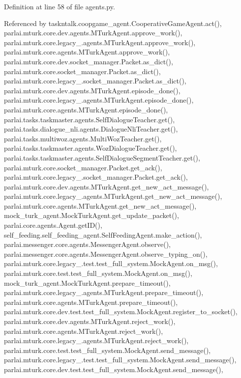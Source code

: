 Definition at line 58 of file agents.\+py.



Referenced by taskntalk.\+coopgame\+\_\+agent.\+Cooperative\+Game\+Agent.\+act(), parlai.\+mturk.\+core.\+dev.\+agents.\+M\+Turk\+Agent.\+approve\+\_\+work(), parlai.\+mturk.\+core.\+legacy\+\_.\+agents.\+M\+Turk\+Agent.\+approve\+\_\+work(), parlai.\+mturk.\+core.\+agents.\+M\+Turk\+Agent.\+approve\+\_\+work(), parlai.\+mturk.\+core.\+dev.\+socket\+\_\+manager.\+Packet.\+as\+\_\+dict(), parlai.\+mturk.\+core.\+socket\+\_\+manager.\+Packet.\+as\+\_\+dict(), parlai.\+mturk.\+core.\+legacy\+\_.\+socket\+\_\+manager.\+Packet.\+as\+\_\+dict(), parlai.\+mturk.\+core.\+dev.\+agents.\+M\+Turk\+Agent.\+episode\+\_\+done(), parlai.\+mturk.\+core.\+legacy\+\_.\+agents.\+M\+Turk\+Agent.\+episode\+\_\+done(), parlai.\+mturk.\+core.\+agents.\+M\+Turk\+Agent.\+episode\+\_\+done(), parlai.\+tasks.\+taskmaster.\+agents.\+Self\+Dialogue\+Teacher.\+get(), parlai.\+tasks.\+dialogue\+\_\+nli.\+agents.\+Dialogue\+Nli\+Teacher.\+get(), parlai.\+tasks.\+multiwoz.\+agents.\+Multi\+Woz\+Teacher.\+get(), parlai.\+tasks.\+taskmaster.\+agents.\+Woz\+Dialogue\+Teacher.\+get(), parlai.\+tasks.\+taskmaster.\+agents.\+Self\+Dialogue\+Segment\+Teacher.\+get(), parlai.\+mturk.\+core.\+socket\+\_\+manager.\+Packet.\+get\+\_\+ack(), parlai.\+mturk.\+core.\+legacy\+\_.\+socket\+\_\+manager.\+Packet.\+get\+\_\+ack(), parlai.\+mturk.\+core.\+dev.\+agents.\+M\+Turk\+Agent.\+get\+\_\+new\+\_\+act\+\_\+message(), parlai.\+mturk.\+core.\+legacy\+\_.\+agents.\+M\+Turk\+Agent.\+get\+\_\+new\+\_\+act\+\_\+message(), parlai.\+mturk.\+core.\+agents.\+M\+Turk\+Agent.\+get\+\_\+new\+\_\+act\+\_\+message(), mock\+\_\+turk\+\_\+agent.\+Mock\+Turk\+Agent.\+get\+\_\+update\+\_\+packet(), parlai.\+core.\+agents.\+Agent.\+get\+I\+D(), self\+\_\+feeding.\+self\+\_\+feeding\+\_\+agent.\+Self\+Feeding\+Agent.\+make\+\_\+action(), parlai.\+messenger.\+core.\+agents.\+Messenger\+Agent.\+observe(), parlai.\+messenger.\+core.\+agents.\+Messenger\+Agent.\+observe\+\_\+typing\+\_\+on(), parlai.\+mturk.\+core.\+legacy\+\_.\+test.\+test\+\_\+full\+\_\+system.\+Mock\+Agent.\+on\+\_\+msg(), parlai.\+mturk.\+core.\+test.\+test\+\_\+full\+\_\+system.\+Mock\+Agent.\+on\+\_\+msg(), mock\+\_\+turk\+\_\+agent.\+Mock\+Turk\+Agent.\+prepare\+\_\+timeout(), parlai.\+mturk.\+core.\+legacy\+\_.\+agents.\+M\+Turk\+Agent.\+prepare\+\_\+timeout(), parlai.\+mturk.\+core.\+agents.\+M\+Turk\+Agent.\+prepare\+\_\+timeout(), parlai.\+mturk.\+core.\+dev.\+test.\+test\+\_\+full\+\_\+system.\+Mock\+Agent.\+register\+\_\+to\+\_\+socket(), parlai.\+mturk.\+core.\+dev.\+agents.\+M\+Turk\+Agent.\+reject\+\_\+work(), parlai.\+mturk.\+core.\+agents.\+M\+Turk\+Agent.\+reject\+\_\+work(), parlai.\+mturk.\+core.\+legacy\+\_.\+agents.\+M\+Turk\+Agent.\+reject\+\_\+work(), parlai.\+mturk.\+core.\+test.\+test\+\_\+full\+\_\+system.\+Mock\+Agent.\+send\+\_\+message(), parlai.\+mturk.\+core.\+legacy\+\_.\+test.\+test\+\_\+full\+\_\+system.\+Mock\+Agent.\+send\+\_\+message(), parlai.\+mturk.\+core.\+dev.\+test.\+test\+\_\+full\+\_\+system.\+Mock\+Agent.\+send\+\_\+message(), 